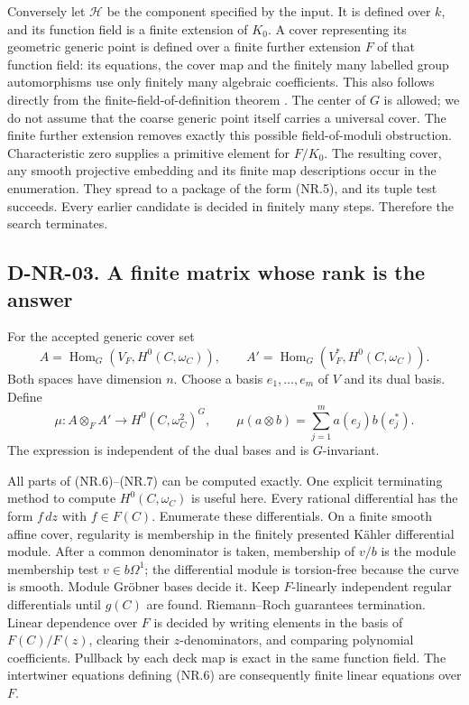 Conversely let $\mathcal H$ be the component specified by the input.
It is defined over $k$, and its function field is a finite extension of
$K_0$.  A cover representing its geometric generic point is defined over
a finite further extension $F$ of that function field: its equations,
the cover map and the finitely many labelled group automorphisms use only
finitely many algebraic coefficients.  This also follows directly from
the finite-field-of-definition theorem
\cite[Theorem~4.3 and its proof, pp.~323--327]{NR:RW}.
The center of $G$ is allowed; we do not assume that the coarse generic
point itself carries a universal cover.  The finite further extension
removes exactly this possible field-of-moduli obstruction.
Characteristic zero supplies a primitive element for $F/K_0$.
The resulting cover, any smooth projective embedding and its finite map
descriptions occur in the enumeration.  They spread to a package of the
form (NR.5), and its tuple test succeeds.  Every earlier candidate is
decided in finitely many steps.  Therefore the search terminates.

\subsection*{D-NR-03. A finite matrix whose rank is the answer}

For the accepted generic cover set
\[
 A=\operatorname{Hom}_{G}(V_F,H^0(C,\omega_C)),\qquad
 A'=\operatorname{Hom}_{G}(V_F^*,H^0(C,\omega_C)).
                                                               \tag{NR.6}
\]
Both spaces have dimension $n$.  Choose a basis $e_1,\ldots,e_m$ of $V$
and its dual basis.  Define
\[
 \mu:A\otimes_F A'\longrightarrow H^0(C,\omega_C^2)^G,
 \qquad
 \mu(a\otimes b)=\sum_{j=1}^m a(e_j)b(e_j^*).                \tag{NR.7}
\]
The expression is independent of the dual bases and is $G$-invariant.

All parts of (NR.6)--(NR.7) can be computed exactly.  One explicit
terminating method to compute $H^0(C,\omega_C)$ is useful here.  Every
rational differential has the form $f\,dz$ with $f\in F(C)$.
Enumerate these differentials.  On a finite smooth affine cover, regularity
is membership in the finitely presented K\"ahler differential module.
After a common denominator is taken, membership of $v/b$ is the module
membership test $v\in b\Omega^1$; the differential module is torsion-free
because the curve is smooth.  Module Gr\"obner bases decide it.  Keep
$F$-linearly independent regular differentials until $g(C)$ are found.
Riemann--Roch guarantees termination.  Linear dependence over $F$ is
decided by writing elements in the basis of $F(C)/F(z)$, clearing their
$z$-denominators, and comparing polynomial coefficients.  Pullback by each
deck map is exact in the same function field.  The intertwiner equations
defining (NR.6) are consequently finite linear equations over $F$.

